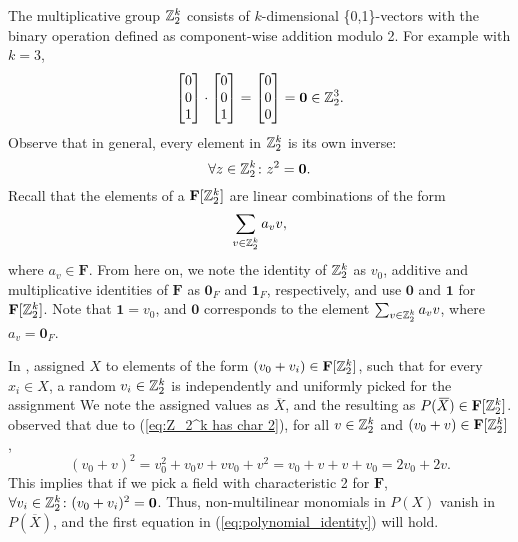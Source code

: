 The multiplicative group $\mathbb Z_2^k$ consists of $k$-dimensional \{0,1\}-vectors 
with the binary operation defined as component-wise addition modulo 2. 
For example with $k = 3$, 
\[
  \begin{bmatrix} 0 \\ 0 \\ 1 \end{bmatrix} \cdot 
  \begin{bmatrix} 0 \\ 0 \\ 1 \end{bmatrix} =
  \begin{bmatrix} 0 \\ 0 \\ 0 \end{bmatrix} = \mathbf{0} \in \mathbb Z_2^3.
\]
Observe that in general, every element in $\mathbb Z_2^k$ is its own inverse:
\begin{equation}
  \label{eq:Z_2^k has char 2}
  \forall z \in \mathbb Z_2^k \colon z^2 = \mathbf{0}.
\end{equation}
Recall that the elements of a
$\mathbf{F}[\mathbb Z_2^k]$ are linear combinations of the form 
\[
  \displaystyle \sum_{v \in \mathbb Z_2^k}a_v v,
\]
where $a_v \in \mathbf{F}$. From here on, we note the identity of $\mathbb Z_2^k$ as $v_0$, additive and 
multiplicative identities of $\mathbf{F}$ as $\mathbf{0}_F$ and $\mathbf{1}_F$, respectively, and 
use $\mathbf{0}$ and $\mathbf{1}$ for
$\mathbf{F}[\mathbb Z_2^k]$. Note that $\mathbf{1} = v_0$, and
$\mathbf{0}$ corresponds to the element $\sum_{v \in \mathbb Z_2^k}a_v v$, where $a_v =
\mathbf{0}_F$.

In \cite{Koutis08}, \citeauthor{Koutis08} assigned $X$ 
to elements of the form $(v_0 + v_i) \in \mathbf{F}[\mathbb Z_2^k]$, 
such that for every $x_i \in X$, a random $v_i \in \mathbb Z_2^k$ is independently and uniformly 
picked for the assignment 
We note the assigned values as $\overbar{X}$, and the resulting
as $P(\,\overline{\!{X}}) \in \mathbf{F}[\mathbb Z_2^k]$. 
\citeauthor{Koutis08} observed that 
due to (\ref{eq:Z_2^k has char 2}), for all $v \in \mathbb Z_2^k$ and $(v_0 + v) \in \mathbf{F}[\mathbb Z_2^k]$, 
\[
  (v_0 + v)^2 = v_0^2 + v_0v + vv_0 + v^2 = v_0 + v + v + v_0 = 2v_0 + 2v.
\]
This implies that if we pick a field with characteristic 2 for $\mathbf{F}$, 
$\forall v_i \in \mathbb Z_2^k \colon (v_0 + v_i)^2 = \mathbf{0}$. Thus, 
non-multilinear monomials in $P(X)$ vanish in $P(\overbar{X})$, and the 
first equation in (\ref{eq:polynomial_identity}) 
will hold.

